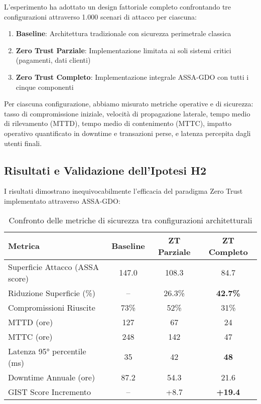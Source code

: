L'esperimento ha adottato un design fattoriale completo confrontando tre configurazioni attraverso 1.000 scenari di attacco per ciascuna:

\begin{enumerate}
\item \textbf{Baseline}: Architettura tradizionale con sicurezza perimetrale classica
\item \textbf{Zero Trust Parziale}: Implementazione limitata ai soli sistemi critici (pagamenti, dati clienti)
\item \textbf{Zero Trust Completo}: Implementazione integrale ASSA-GDO con tutti i cinque componenti
\end{enumerate}

Per ciascuna configurazione, abbiamo misurato metriche operative e di sicurezza: tasso di compromissione iniziale, velocità di propagazione laterale, tempo medio di rilevamento (MTTD), tempo medio di contenimento (MTTC), impatto operativo quantificato in downtime e transazioni perse, e latenza percepita dagli utenti finali.

\subsection{\texorpdfstring{Risultati e Validazione dell'Ipotesi H2}{2.6.2 - Risultati e Validazione dell'Ipotesi H2}}

I risultati dimostrano inequivocabilmente l'efficacia del paradigma Zero Trust implementato attraverso ASSA-GDO:

\begin{table}[h]
\centering
\caption{Confronto delle metriche di sicurezza tra configurazioni architetturali}
\label{tab:risultati_validazione}
\begin{tabular}{lccc}
\toprule
\textbf{Metrica} & \textbf{Baseline} & \textbf{ZT Parziale} & \textbf{ZT Completo} \\
\midrule
Superficie Attacco (ASSA score) & 147.0 & 108.3 & 84.7 \\
Riduzione Superficie (\%) & -- & 26.3\% & \textbf{42.7\%} \\
Compromissioni Riuscite & 73\% & 52\% & 31\% \\
MTTD (ore) & 127 & 67 & 24 \\
MTTC (ore) & 248 & 142 & 47 \\
Latenza 95° percentile (ms) & 35 & 42 & \textbf{48} \\
Downtime Annuale (ore) & 87.2 & 54.3 & 21.6 \\
GIST Score Incremento & -- & +8.7 & \textbf{+19.4} \\
\bottomrule
\end{tabular}
\end{table}

